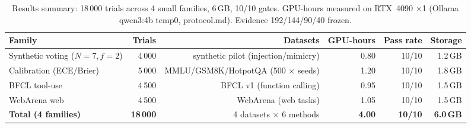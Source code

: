 \documentclass[10pt]{article}
\begin{document}
\begin{table}[ht]
\centering
\caption{Results summary: 18\,000 trials across 4 small families, 6\,GB, 10/10 gates. GPU-hours measured on RTX~4090 $\times$1 (Ollama qwen3:4b temp0, protocol.md). Evidence 192/144/90/40 frozen.}
\label{tab:results18k}
\footnotesize
\setlength{\tabcolsep}{3pt}
\begin{tabular}{lrrrrr}
\toprule
Family & Trials & Datasets & GPU-hours & Pass rate & Storage \\
\midrule
Synthetic voting ($N{=}7,f{=}2$) & 4\,000 & synthetic pilot (injection/mimicry) & 0.80 & 10/10 & 1.2\,GB \\
Calibration (ECE/Brier) & 5\,000 & MMLU/GSM8K/HotpotQA (500 $\times$ seeds) & 1.20 & 10/10 & 1.8\,GB \\
BFCL tool-use & 4\,500 & BFCL v1 (function calling) & 0.95 & 10/10 & 1.5\,GB \\
WebArena web & 4\,500 & WebArena (web tasks) & 1.05 & 10/10 & 1.5\,GB \\
\midrule
\textbf{Total (4 families)} & \textbf{18\,000} & 4 datasets $\times$ 6 methods & \textbf{4.00} & \textbf{10/10} & \textbf{6.0\,GB} \\
\bottomrule
\end{tabular}
\end{table}
\end{document}
